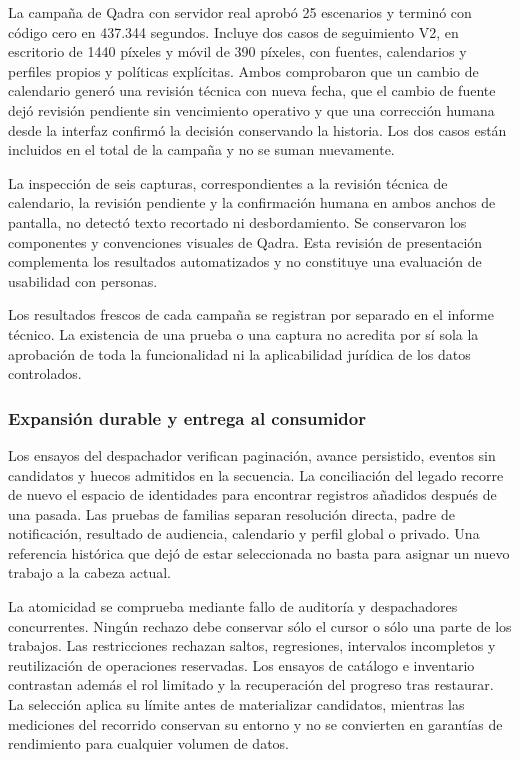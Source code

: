 La campaña de Qadra con servidor real aprobó 25 escenarios y terminó con código cero en 437.344 segundos. Incluye dos casos de seguimiento V2, en escritorio de 1440 píxeles y móvil de 390 píxeles, con fuentes, calendarios y perfiles propios y políticas explícitas. Ambos comprobaron que un cambio de calendario generó una revisión técnica con nueva fecha, que el cambio de fuente dejó revisión pendiente sin vencimiento operativo y que una corrección humana desde la interfaz confirmó la decisión conservando la historia. Los dos casos están incluidos en el total de la campaña y no se suman nuevamente.

La inspección de seis capturas, correspondientes a la revisión técnica de calendario, la revisión pendiente y la confirmación humana en ambos anchos de pantalla, no detectó texto recortado ni desbordamiento. Se conservaron los componentes y convenciones visuales de Qadra. Esta revisión de presentación complementa los resultados automatizados y no constituye una evaluación de usabilidad con personas.

Los resultados frescos de cada campaña se registran por separado en el informe técnico. La existencia de una prueba o una captura no acredita por sí sola la aprobación de toda la funcionalidad ni la aplicabilidad jurídica de los datos controlados.

\subsubsection{Expansión durable y entrega al consumidor}

Los ensayos del despachador verifican paginación, avance persistido, eventos sin candidatos y huecos admitidos en la secuencia. La conciliación del legado recorre de nuevo el espacio de identidades para encontrar registros añadidos después de una pasada. Las pruebas de familias separan resolución directa, padre de notificación, resultado de audiencia, calendario y perfil global o privado. Una referencia histórica que dejó de estar seleccionada no basta para asignar un nuevo trabajo a la cabeza actual.

La atomicidad se comprueba mediante fallo de auditoría y despachadores concurrentes. Ningún rechazo debe conservar sólo el cursor o sólo una parte de los trabajos. Las restricciones rechazan saltos, regresiones, intervalos incompletos y reutilización de operaciones reservadas. Los ensayos de catálogo e inventario contrastan además el rol limitado y la recuperación del progreso tras restaurar. La selección aplica su límite antes de materializar candidatos, mientras las mediciones del recorrido conservan su entorno y no se convierten en garantías de rendimiento para cualquier volumen de datos.

